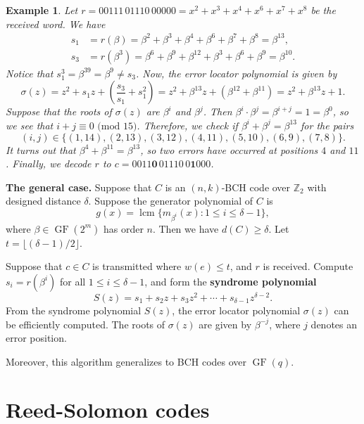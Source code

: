 \documentclass[10pt]{article}
\newcommand{\Z}{\mathbb{Z}}
\DeclareMathOperator{\GF}{GF}
\DeclareMathOperator{\lcm}{lcm}
\theoremstyle{newstyle}
\newtheorem{exmp}[thm]{Example}
\begin{document}
\begin{exmp}
Let $r = 00111\,01110\,00000 = x^2 + x^3 + x^4 + x^6 + x^7 + x^8$ be the received word. We have 
\begin{align*}
    s_1 &= r(\beta) = \beta^2 + \beta^3 + \beta^4 + \beta^6 + \beta^7 + \beta^8 = \beta^{13}, \\
    s_3 &= r(\beta^3) = \beta^6 + \beta^9 + \beta^{12} + \beta^3 + \beta^6 + \beta^9 = \beta^{10}. 
\end{align*}
Notice that $s_1^3 = \beta^{39} = \beta^9 \neq s_3$. Now, the error locator polynomial is given by 
\[ \sigma(z) = z^2 + s_1z + \left( \frac{s_3}{s_1} + s_1^2 \right) = 
z^2 + \beta^{13}z + (\beta^{12} + \beta^{11}) = z^2 + \beta^{13}z + 1. \]
Suppose that the roots of $\sigma(z)$ are $\beta^i$ and $\beta^j$. Then $\beta^i \cdot \beta^j 
= \beta^{i+j} = 1 = \beta^0$, so we see that $i + j \equiv 0 \text{ (mod 15)}$. Therefore, 
we check if $\beta^i + \beta^j = \beta^{13}$ for the pairs 
\[ (i, j) \in \{(1, 14), (2, 13), (3, 12), (4, 11), (5, 10), (6, 9), (7, 8)\}. \]
It turns out that $\beta^4 + \beta^{11} = \beta^{13}$, so two errors have occurred at positions $4$ 
and $11$. Finally, we decode $r$ to $c = 0011\mathbf{0}\,01110\,0\mathbf{1}000$. 
\end{exmp}

{\bf The general case.}
Suppose that $C$ is an $(n, k)$-BCH code over $\Z_2$ with designed distance $\delta$. Suppose the 
generator polynomial of $C$ is 
\[ g(x) = \lcm\{m_{\beta^i}(x) : 1 \leq i \leq \delta-1\}, \]
where $\beta \in \GF(2^m)$ has order $n$. Then we have $d(C) \geq \delta$. Let $t = \lfloor 
(\delta-1)/2 \rfloor$. 

Suppose that $c \in C$ is transmitted where $w(e) \leq t$, and $r$ is received. Compute 
$s_i = r(\beta^i)$ for all $1 \leq i \leq \delta-1$, and form the {\bf syndrome polynomial} 
\[ S(z) = s_1 + s_2z + s_3z^2 + \cdots + s_{\delta-1} z^{\delta-2}. \]
From the syndrome polynomial $S(z)$, the error locator polynomial $\sigma(z)$ can be efficiently 
computed. The roots of $\sigma(z)$ are given by $\beta^{-j}$, where $j$ denotes an error position. 

Moreover, this algorithm generalizes to BCH codes over $\GF(q)$.

\newpage 
\section{Reed-Solomon codes}

\end{document}
